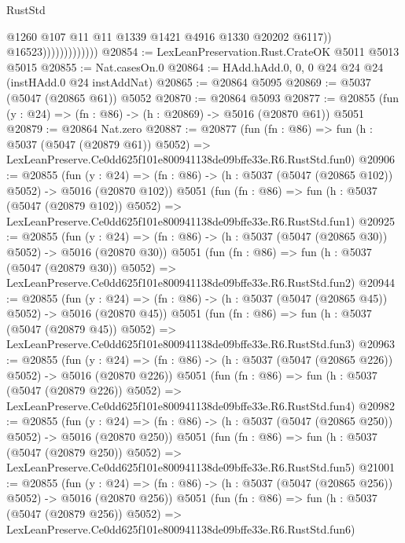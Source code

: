 \begin{lexlean}{RustStd}
\begin{coremodule}
                                  @1260
                                  @107
                                  @11
                                  @11
                                  @1339
                                  @1421
                                  @4916
                                  @1330
                                  @20202
                                  @6117))
                              @16523)))))))))))))
@20854 := LexLeanPreservation.Rust.CrateOK @5011 @5013 @5015
@20855 := Nat.casesOn.{0}
@20864 := HAdd.hAdd.{0, 0, 0} @24 @24 @24 (instHAdd.{0} @24 instAddNat)
@20865 := @20864 @5095
@20869 := @5037 (@5047 (@20865 @61)) @5052
@20870 := @20864 @5093
@20877 := @20855 (fun (y : @24) => (fn : @86) -> (h : @20869) -> @5016 (@20870 @61)) @5051
@20879 := @20864 Nat.zero
@20887 := @20877
    (fun (fn : @86) =>
    fun (h : @5037 (@5047 (@20879 @61)) @5052) =>
    LexLeanPreserve.Ce0dd625f101e800941138de09bffe33e.R6.RustStd.fun0)
@20906 := @20855
    (fun (y : @24) => (fn : @86) -> (h : @5037 (@5047 (@20865 @102)) @5052) -> @5016 (@20870 @102))
    @5051
    (fun (fn : @86) =>
    fun (h : @5037 (@5047 (@20879 @102)) @5052) =>
    LexLeanPreserve.Ce0dd625f101e800941138de09bffe33e.R6.RustStd.fun1)
@20925 := @20855
    (fun (y : @24) => (fn : @86) -> (h : @5037 (@5047 (@20865 @30)) @5052) -> @5016 (@20870 @30))
    @5051
    (fun (fn : @86) =>
    fun (h : @5037 (@5047 (@20879 @30)) @5052) =>
    LexLeanPreserve.Ce0dd625f101e800941138de09bffe33e.R6.RustStd.fun2)
@20944 := @20855
    (fun (y : @24) => (fn : @86) -> (h : @5037 (@5047 (@20865 @45)) @5052) -> @5016 (@20870 @45))
    @5051
    (fun (fn : @86) =>
    fun (h : @5037 (@5047 (@20879 @45)) @5052) =>
    LexLeanPreserve.Ce0dd625f101e800941138de09bffe33e.R6.RustStd.fun3)
@20963 := @20855
    (fun (y : @24) => (fn : @86) -> (h : @5037 (@5047 (@20865 @226)) @5052) -> @5016 (@20870 @226))
    @5051
    (fun (fn : @86) =>
    fun (h : @5037 (@5047 (@20879 @226)) @5052) =>
    LexLeanPreserve.Ce0dd625f101e800941138de09bffe33e.R6.RustStd.fun4)
@20982 := @20855
    (fun (y : @24) => (fn : @86) -> (h : @5037 (@5047 (@20865 @250)) @5052) -> @5016 (@20870 @250))
    @5051
    (fun (fn : @86) =>
    fun (h : @5037 (@5047 (@20879 @250)) @5052) =>
    LexLeanPreserve.Ce0dd625f101e800941138de09bffe33e.R6.RustStd.fun5)
@21001 := @20855
    (fun (y : @24) => (fn : @86) -> (h : @5037 (@5047 (@20865 @256)) @5052) -> @5016 (@20870 @256))
    @5051
    (fun (fn : @86) =>
    fun (h : @5037 (@5047 (@20879 @256)) @5052) =>
    LexLeanPreserve.Ce0dd625f101e800941138de09bffe33e.R6.RustStd.fun6)

\end{coremodule}
\end{lexlean}
